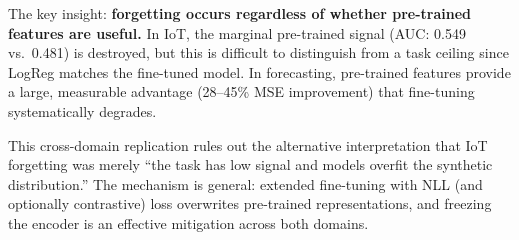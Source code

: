 The key insight: \textbf{forgetting occurs regardless of whether
pre-trained features are useful.}
In IoT, the marginal pre-trained signal (AUC: 0.549 vs.\ 0.481)
is destroyed, but this is difficult to distinguish from a task ceiling
since LogReg matches the fine-tuned model.
In forecasting, pre-trained features provide a large, measurable
advantage (28--45\% MSE improvement) that fine-tuning systematically
degrades.

This cross-domain replication rules out the alternative interpretation
that IoT forgetting was merely ``the task has low signal and models
overfit the synthetic distribution.''
The mechanism is general: extended fine-tuning with NLL (and optionally
contrastive) loss overwrites pre-trained representations, and
freezing the encoder is an effective mitigation across both domains.
